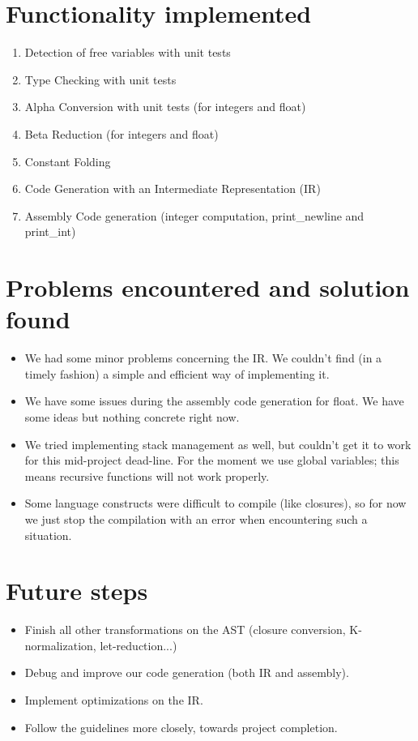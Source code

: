\documentclass[a4paper,10pt]{article}
\begin{document}
\section{Functionality implemented}
\begin{enumerate}
	\item Detection of free variables with unit tests
	\item Type Checking with unit tests
	\item Alpha Conversion with unit tests (for integers and float)
	\item Beta Reduction (for integers and float)
	\item Constant Folding
	\item Code Generation with an Intermediate Representation (IR)
	\item Assembly Code generation (integer computation, print\_newline and print\_int)
\end{enumerate}
\section{Problems encountered and solution found}
\begin{itemize}
	\item We had some minor problems concerning the IR. We couldn't find 
		  (in a timely fashion) a simple and efficient way of implementing it.
	\item We have some issues during the assembly code generation for float. We have some ideas 
		  but nothing concrete right now.
    \item We tried implementing stack management as well, but couldn't get it to work for this mid-project dead-line. For the moment we use global variables; this means recursive functions will not work properly.
    \item Some language constructs were difficult to compile (like closures), so for now we just stop the compilation with an error when encountering such a situation.
\end{itemize}
\section{Future steps}
\begin{itemize}
	\item Finish all other transformations on the AST (closure conversion, K-normalization, let-reduction...)
    \item Debug and improve our code generation (both IR and assembly).
    \item Implement optimizations on the IR.
    \item Follow the guidelines more closely, towards project completion.
\end{itemize}
\end{document}

